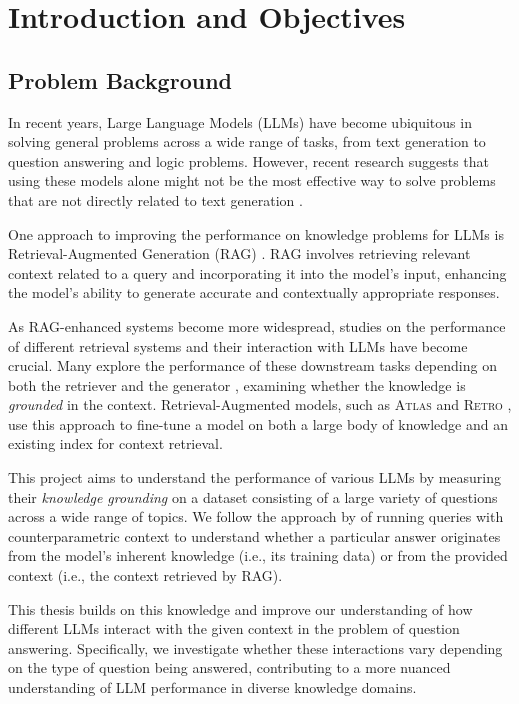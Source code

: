\section{Introduction and Objectives}

\subsection{Problem Background}

In recent years, Large Language Models (LLMs) have become ubiquitous in solving general problems across a wide range of tasks, from text generation to question answering and logic problems.
However, recent research suggests that using these models alone might not be the most effective way to solve problems that are not directly related to text generation \citep{treeofthoughts}.

One approach to improving the performance on knowledge problems for LLMs is Retrieval-Augmented Generation (RAG) \citep{rag}. RAG involves retrieving relevant context related to a query and incorporating it into the model's input, enhancing the model's ability to generate accurate and contextually appropriate responses.

As RAG-enhanced systems become more widespread, studies on the performance of different retrieval systems and their interaction with LLMs have become crucial.
Many explore the performance of these downstream tasks depending on both the retriever and the generator \citep{can_rag_models_reason,gpt3}, examining whether the knowledge is \textit{grounded} in the context.
Retrieval-Augmented models, such as \textsc{Atlas} \citep{atlas_foundational} and \textsc{Retro} \citep{retro}, use this approach to fine-tune a model on both a large body of knowledge and an existing index for context retrieval.

This project aims to understand the performance of various LLMs by measuring their \textit{knowledge grounding} on a dataset consisting of a large variety of questions across a wide range of topics.
We follow the approach by \citeauthor{factual_recall} of running queries with counterparametric context to understand whether a particular answer originates from the model's inherent knowledge (i.e., its training data) or from the provided context (i.e., the context retrieved by RAG).

This thesis builds on this knowledge and improve our understanding of how different LLMs interact with the given context in the problem of question answering.
Specifically, we investigate whether these interactions vary depending on the type of question being answered, contributing to a more nuanced understanding of LLM performance in diverse knowledge domains.

